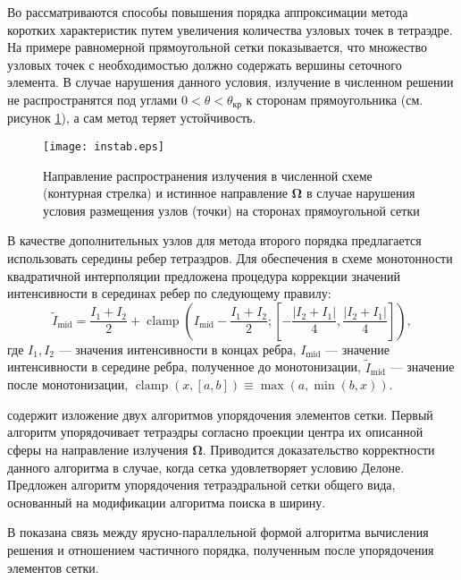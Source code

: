 Во  рассматриваются способы повышения порядка аппроксимации метода коротких характеристик путем увеличения количества узловых точек в тетраэдре. На примере равномерной прямоугольной сетки показывается, что множество узловых точек с необходимостью должно содержать вершины сеточного элемента. В случае нарушения данного условия, излучение в численном решении не распространятся под углами $0 < \theta < \theta_\text{кр}$ к сторонам прямоугольника (см. рисунок \ref{fig:instab}), а сам метод теряет устойчивость.
\begin{figure}[ht!]
\centering
\texttt{[image: instab.eps]}
\caption{Направление распространения излучения в численной схеме (контурная стрелка) и истинное направление $\boldsymbol \Omega$ в случае нарушения условия размещения узлов (точки) на сторонах прямоугольной сетки}
\label{fig:instab}
\end{figure}

В качестве дополнительных узлов для метода второго порядка предлагается использовать середины ребер тетраэдров. Для обеспечения в схеме монотонности квадратичной интерполяции предложена процедура коррекции значений интенсивности в серединах ребер по следующему правилу:
\[
\tilde I_\text{mid} = \frac{I_1 + I_2}{2} + \operatorname{clamp}\left(
I_\text{mid} - \frac{I_1 + I_2}{2}; \left[
- \frac{|I_2 + I_1|}{4}, \frac{|I_2 + I_1|}{4}
\right]
\right),
\]
где $I_1, I_2$ --- значения интенсивности в концах ребра, $I_\text{mid}$ --- значение интенсивности в середине ребра, полученное до монотонизации, $\tilde I_\text{mid}$ --- значение после монотонизации, $\operatorname{clamp}(x, [a, b]) \equiv \max(a, \min(b, x))$.

 содержит изложение двух алгоритмов упорядочения элементов сетки. Первый алгоритм упорядочивает тетраэдры согласно проекции центра их описанной сферы на направление излучения $\boldsymbol \Omega$. Приводится доказательство корректности данного алгоритма в случае, когда сетка удовлетворяет условию Делоне. Предложен алгоритм упорядочения тетраэдральной сетки общего вида, основанный на модификации алгоритма поиска в ширину.

В  показана связь между ярусно-параллельной формой алгоритма вычисления решения и отношением частичного порядка, полученным после упорядочения элементов сетки.


